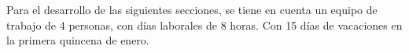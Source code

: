
Para el desarrollo de las siguientes secciones, se tiene en cuenta un equipo de trabajo de 4 personas, con días laborales de 8 horas. Con 15 días de vacaciones en la primera quincena de enero.











%